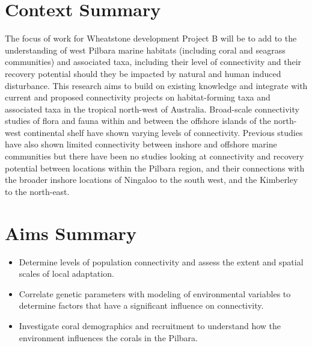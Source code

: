 \documentclass[version=last, paper=a4, DIV=18, usenames, dvipsnames]{scrartcl}
\begin{document}
\setcounter{tocdepth}{2}
\tableofcontents
\clearpage






\section{Context Summary}



The focus of work for Wheatstone development Project B will be to add to the understanding of west Pilbara marine habitats (including coral and seagrass communities) and associated taxa, including their level of connectivity and their recovery potential should they be impacted by natural and human induced disturbance. This research aims to build on existing knowledge and integrate with current and proposed connectivity projects on habitat-forming taxa and associated taxa in the tropical north-west of Australia. Broad-scale connectivity studies of flora and fauna within and between the offshore islands of the north-west continental shelf have shown varying levels of connectivity. Previous studies have also shown limited connectivity between inshore and offshore marine communities but there have been no studies looking at connectivity and recovery potential between locations within the Pilbara region, and their connections with the broader inshore locations of Ningaloo to the south west, and the Kimberley to the north-east.






\section{Aims Summary}



\begin{itemize}

  \item Determine levels of population connectivity and assess the extent and spatial scales of local adaptation.

  \item Correlate genetic parameters with modeling of environmental variables to determine factors that have a significant influence on connectivity.

  \item Investigate coral demographics and recruitment to understand how the environment influences the corals in the Pilbara.

\end{itemize}
\end{document}
